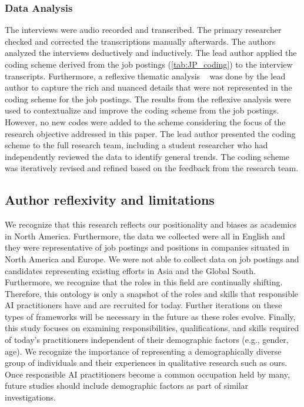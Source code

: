 \documentclass[sigconf]{acmart}
\begin{document}
\subsubsection{Data Analysis}

The interviews were audio recorded and transcribed. The primary researcher checked and corrected the transcriptions manually afterwards. 
The authors analyzed the interviews deductively and inductively. The lead author applied the coding scheme derived from the job postings (\autoref{tab:JP_coding}) to the interview transcripts. Furthermore, a reflexive thematic analysis ~\cite{Braun2006-rj} was done by the lead author to capture the rich and nuanced details that were not represented in the coding scheme for the job postings. The results from the reflexive analysis were used to contextualize and improve the coding scheme from the job postings. However, no new codes were added to the scheme considering the focus of the research objective addressed in this paper. The lead author presented the coding scheme to the full research team, including a student researcher who had independently reviewed the data to identify general trends. The coding scheme was iteratively revised and refined based on the feedback from the research team. 

\subsection{Author reflexivity and limitations}

We recognize that this research reflects our positionality and biases as academics in North America. Furthermore, the data we collected were all in English and they were representative of job postings and positions in companies situated in North America and Europe. We were not able to collect data on job postings and candidates representing existing efforts in Asia and the Global South. 
Furthermore, we recognize that the roles in this field are continually shifting. Therefore, this ontology is only a snapshot of the roles and skills that responsible AI practitioners have and are recruited for today. Further iterations on these types of frameworks will be necessary in the future as these roles evolve. Finally, this study focuses on examining responsibilities, qualifications, and skills required of today's practitioners independent of their demographic factors (e.g., gender, age). We recognize the importance of representing a demographically diverse group of individuals and their experiences in qualitative research such as ours. Once responsible AI practitioners become a common occupation held by many, future studies should include demographic factors as part of similar investigations.
\end{document}
